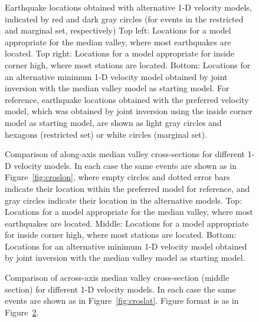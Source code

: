 \documentclass[jgr]{agu2001}
\renewcommand{\includefig}[2]{}
\newlength{\tw}
\begin{document}
\begin{figure}

\setlength{\figarrwidth}{0.5\tw}

\includefig{seismag-map-var/seismag-map-jhd-mva-obh10}{20pc} \includefig{seismag-map-var/seismag-map-jhd-pro109kmvel}{20pc} %

\includefig{seismag-map-var/seismag-map-inv-mva-obh10}{20pc} %

\caption{Earthquake locations obtained with alternative 1-D velocity
models, indicated by  red and dark gray circles (for events in the
restricted and marginal set, respectively)
Top left: Locations for a model appropriate for the median valley, where most
earthquakes are located. 
Top right: Locations for a model appropriate for inside corner high, where most
stations are located. 
Bottom: Locations for an alternative minimum 1-D velocity model
obtained by joint inversion with the median valley model as starting
model.
  For reference, earthquake locations obtained with the
preferred velocity model, which was obtained by joint inversion using
the inside corner model as starting model, are shown as 
 light gray circles and hexagons  (restricted set) or white circles
(marginal set). }
\label{fig:mapvar}
\end{figure}


\begin{figure}

\includefig{cros/cros-ns-jhd-mva-obh10}{30pc} %

\includefig{cros/cros-ns-jhd-pro109kmvel}{30pc} %

\includefig{cros/cros-ns-inv-mva-obh10}{30pc} %

\caption{Comparison of along-axis median valley cross-sections for different 1-D velocity
models.  In each case the same events are shown as in
Figure~\ref{fig:croslon}, where empty circles and dotted error bars
indicate their location within the preferred model for reference, and
gray circles indicate their location in the alternative models.
Top: Locations for a model appropriate for the median valley, where most
earthquakes are located. 
Middle: Locations for a model appropriate for inside corner high, where most
stations are located. 
Bottom: Locations for an alternative minimum 1-D velocity model
obtained by joint inversion with the median valley model as starting
model.}
\label{fig:croslonvar}
\end{figure}

\begin{figure}

\includefig{cros/cros-2-jhd-mva-obh10}{30pc} %

\includefig{cros/cros-2-jhd-pro109kmvel}{30pc} %

\includefig{cros/cros-2-inv-mva-obh10}{30pc} %

\caption{Comparison of across-axis median valley cross-section (middle
section) for different 1-D velocity
models.  In each case the same events are shown as in
Figure~\ref{fig:croslat}.  Figure format is as in Figure~\ref{fig:croslonvar}.}
\label{fig:croslatvar}
\end{figure}
\end{document}
